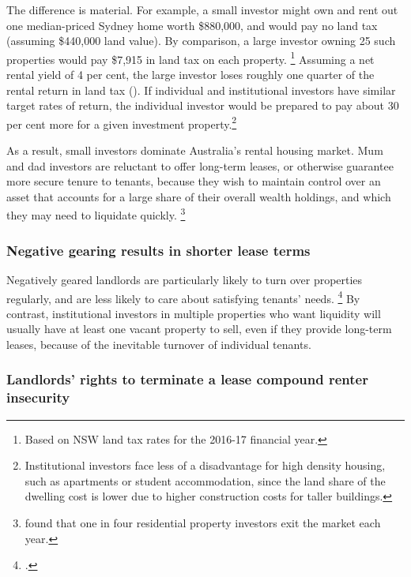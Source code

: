 The difference is material.
For example, a small investor might own and rent out one median-priced Sydney home worth \$880,000, and would pay no land tax (assuming \$440,000 land value).
By comparison, a large investor owning 25 such properties would pay \$7,915 in land tax on each property.%
	\footnote{Based on NSW land tax rates for the 2016-17 financial year.}
Assuming a net rental yield of 4 per cent, the large investor loses roughly one quarter of the rental return in land tax ().
If individual and institutional investors have similar target rates of return, the individual investor would be prepared to pay about 30 per cent more for a given investment property.\footnote{Institutional investors face less of a disadvantage for high density housing, such as apartments or student accommodation, since the land share of the dwelling cost is lower due to higher construction costs for taller buildings.}

As a result, small investors dominate Australia's rental housing market.
Mum and dad investors are reluctant to offer long-term leases, or otherwise guarantee more secure tenure to tenants, because they wish to maintain control over an asset that accounts for a large share of their overall wealth holdings, and which they may need to liquidate quickly.%
	\footnote{\textcite{Wood-Ong-AHURI-2010-factors-affecting-landlords} found that one in four residential property investors exit the market each year.}

\subsubsection{Negative gearing results in shorter lease terms }\label{subsec:negative-gearing-results-in-shorter-lease-terms}

Negatively geared landlords are particularly likely to turn over properties regularly, and are less likely to care about satisfying tenants' needs.%
	\footcite[][26]{DaleyWood2016-Negative-Gearing-CGT}
By contrast, institutional investors in multiple properties who want liquidity will usually have at least one vacant property to sell, even if they provide long-term leases, because of the inevitable turnover of individual tenants.

\subsubsection{Landlords' rights to terminate a lease compound renter insecurity }\label{subsec:landlords-right-to-terminate-a-lease-without-grounds-compounds-renter-insecurity}

